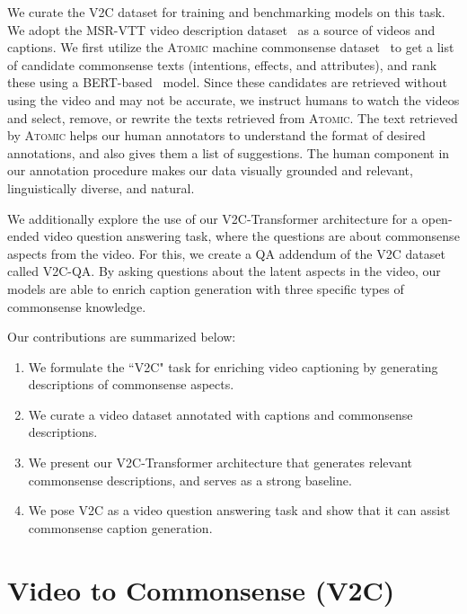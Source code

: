 We curate the V2C dataset for training and benchmarking models on this task.
We adopt the MSR-VTT video description dataset~\citep{xu2016msr} as a source of videos and captions.
We first utilize the A\textsc{tomic} machine commonsense dataset~\cite{sap2018atomic} to get a list of candidate commonsense texts (intentions, effects, and attributes), and rank these using a BERT-based~\cite{devlin2018bert} model.
Since these candidates are retrieved without using the video and may not be accurate, we instruct humans to watch the videos and select, remove, or rewrite the texts retrieved from A\textsc{tomic}.
The text retrieved by A\textsc{tomic} helps our human annotators to understand the format of desired annotations, and also gives them a list of suggestions.
The human component in our annotation procedure makes our data visually grounded and relevant, linguistically diverse, and natural.

We additionally explore the use of our V2C-Transformer architecture for a open-ended video question answering task, where the questions are about commonsense aspects from the video.
For this, we create a QA addendum of the V2C dataset called V2C-QA.
By asking questions about the latent aspects in the video, our models are able to enrich caption generation with three specific types of commonsense knowledge.

Our contributions are summarized below:
\begin{enumerate}
    \item We formulate the ``V2C" task for enriching video captioning by generating descriptions of commonsense aspects.
    \item We curate a video dataset annotated with captions and commonsense descriptions.
    \item We present our V2C-Transformer architecture that generates relevant commonsense descriptions, and serves as a strong baseline.
    \item We pose V2C as a video question answering task and show that it can assist commonsense caption generation.
\end{enumerate}


\section{Video to Commonsense (V2C)}
